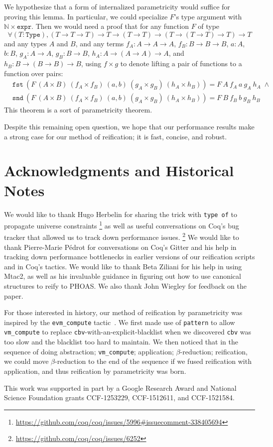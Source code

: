 We hypothesize that a form of internalized parametricity would suffice for proving this lemma.
In particular, we could specialize $F$'s type argument with $\mathbb N \times \texttt{expr}$.
Then we would need a proof that for any function $F$ of type
\[
\forall (T : \texttt{Type}), (T \to T \to T) \to T \to (T \to T) \to (T \to (T \to T) \to T) \to T
\]
and any types $A$ and $B$, and any terms $f_A : A \to A \to A$, $f_B : B \to B\to B$, $a : A$, $b : B$, $g_A : A \to A$, $g_B : B \to B$, $h_A : A \to (A \to A) \to A$, and $h_B : B \to (B \to B) \to B$, using $f\times g$ to denote lifting a pair of functions to a function over pairs:
\begin{align*}
  & \texttt{fst}\ \left(F\ (A \times B)\ (f_A \times f_B)\ (a, b)\ (g_A \times g_B)\ (h_A \times h_B)\right) = F\ A\ f_A\ a\ g_A\ h_A \;\wedge \\
  & \texttt{snd}\ \left(F\ (A \times B)\ (f_A \times f_B)\ (a, b)\ (g_A \times g_B)\ (h_A \times h_B)\right) = F\ B\ f_B\ b\ g_B\ h_B
\end{align*}
This theorem is a sort of parametricity theorem.

Despite this remaining open question, we hope that our performance results make a strong case for our method of reification; it is fast, concise, and robust.

\section{Acknowledgments and Historical Notes}

We would like to thank Hugo Herbelin for sharing the trick with \texttt{type of} to propagate universe constraints%
\footnote{%
    \url{https://github.com/coq/coq/issues/5996\#issuecomment-338405694}%
}
as well as useful conversations on Coq's bug tracker that allowed us to track down performance issues.%
\footnote{%
    \url{https://github.com/coq/coq/issues/6252}%
}
We would like to thank Pierre-Marie Pédrot for conversations on Coq's Gitter and his help in tracking down performance bottlenecks in earlier versions of our reification scripts and in Coq's tactics.
We would like to thank Beta Ziliani for his help in using Mtac2, as well as his invaluable guidance in figuring out how to use canonical structures to reify to PHOAS.
We also thank John Wiegley for feedback on the paper.

For those interested in history, our method of reification by parametricity was inspired by the \texttt{evm\_compute} tactic~\cite{MirrorShardITP14}.
We first made use of \texttt{pattern} to allow \texttt{vm\_compute} to replace \texttt{cbv}-with-an-explicit-blacklist when we discovered \texttt{cbv} was too slow and the blacklist too hard to maintain.
We then noticed that in the sequence of doing abstraction; \texttt{vm\_compute}; application; $\beta$-reduction; reification, we could move $\beta$-reduction to the end of the sequence if we fused reification with application, and thus reification by parametricity was born.

This work was supported in part by a Google Research Award and National Science Foundation grants CCF-1253229, CCF-1512611, and CCF-1521584.
